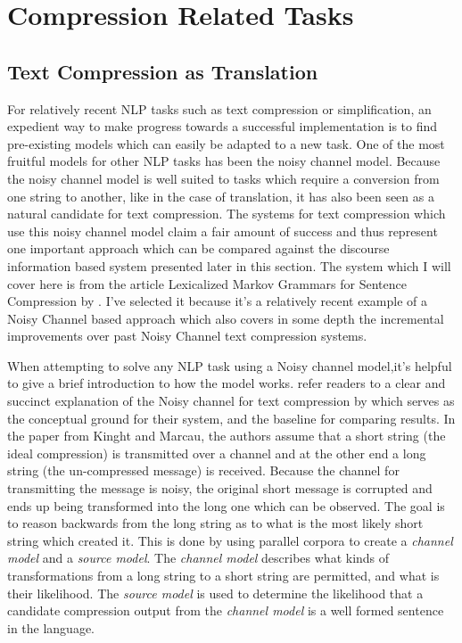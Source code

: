 \section{Compression Related Tasks}


\subsection{Text Compression as Translation}


{For relatively recent NLP tasks such as text compression or simplification, an expedient way to make progress towards a successful implementation is to find pre-existing models which can easily be adapted to a new task.  One of the most fruitful models for other NLP tasks has been the noisy channel model. Because the noisy channel model is well suited to tasks which require a conversion from one string to another, like in the case of translation, it has also been seen as a natural candidate for text compression\citep{knight2000statistics}.  The systems for text compression which use this noisy channel model claim a fair amount of success and thus represent one important approach which can be compared against the discourse information based system presented later in this section.  The system which I will cover here is from the article Lexicalized Markov Grammars for Sentence Compression by \citet{galley2007lexicalized}.  I've selected it because it's a relatively recent example of a Noisy Channel based approach which also covers in some depth the incremental improvements over past Noisy Channel text compression systems.}


{When attempting to solve any NLP task using a Noisy channel model,it's helpful to give a brief introduction to how the model works.   \citet{galley2007lexicalized} refer readers to a clear and succinct explanation of the Noisy channel for text compression by \citet{knight2000statistics} which serves as the conceptual ground for their system, and the baseline for comparing results.  In the paper from Kinght and Marcau, the authors assume that a short string (the ideal compression) is transmitted over a channel and at the other end a long string (the un-compressed message) is received.  Because the channel for transmitting the message is noisy, the original short message is corrupted and ends up being transformed into the long one which can be observed. The goal is to reason backwards from the long string as to what is the most likely short string which created it.  This is done by using parallel corpora to create a \textit{channel model} and a \textit{source model}.  The \textit{channel model} describes what kinds of transformations from a long string to a short string are permitted, and what is their likelihood. The \textit{source model} is used to determine the likelihood that a candidate compression output from the \textit{channel model} is a well formed sentence in the language.}  

